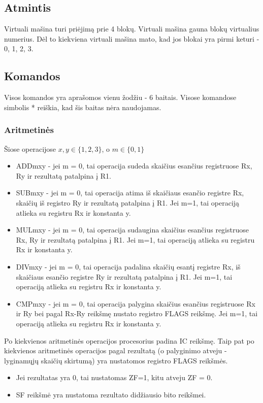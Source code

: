\documentclass{VUMIFInfKursinis}
\begin{document}
\subsection{Atmintis}

Virtuali mašina turi priėjimą prie 4 blokų. Virtuali mašina gauna blokų virtualius numerius. Dėl to kiekviena virtuali mašina mato, kad jos blokai yra pirmi keturi - 0, 1, 2, 3.

\subsection{Komandos}

Visos komandos yra aprašomos vienu žodžiu - 6 baitais. Visose komandose simbolis * reiškia, kad šis baitas nėra naudojamas.

\subsubsection{Aritmetinės}
Šiose operacijose $x, y \in \{1, 2, 3\}$, o $m \in \{0, 1\}$
\begin{itemize}
	\item ADDmxy - jei m = 0, tai operacija sudeda skaičius esančius registruose Rx, Ry ir rezultatą patalpina į R1.
	\item SUBmxy - jei m = 0, tai operacija atima iš skaičiaus esančio registre Rx, skaičių iš registro Ry ir rezultatą patalpina į R1. Jei m=1, tai operaciją atlieka su registru Rx ir konstanta y.
	\item MULmxy - jei m = 0, tai operacija sudaugina skaičius esančius registruose Rx, Ry ir rezultatą patalpina į R1. Jei m=1, tai operaciją atlieka su registru Rx ir konstanta y.
	\item DIVmxy - jei m = 0, tai operacija padalina skaičių esantį registre Rx, iš skaičiaus esančio registre Ry ir rezultatą patalpina į R1. Jei m=1, tai operaciją atlieka su registru Rx ir konstanta y.
	\item CMPmxy - jei m = 0, tai operacija palygina skaičius esančius registruose Rx ir Ry bei pagal Rx-Ry reikšmę nustato registro FLAGS reikšmę. Jei m=1, tai operaciją atlieka su registru Rx ir konstanta y.
\end{itemize}

Po kiekvienos aritmetinės operacijos procesorius padina IC reikšmę. Taip pat po kiekvienos aritmetinės operacijos pagal rezultatą (o palyginimo atveju - lyginamųjų skaičių skirtumą) yra nustatomos registro FLAGS reikšmės.

\begin{itemize}
	\item Jei rezultatas yra 0, tai nustatomas ZF=1, kitu atveju ZF = 0.
	\item SF reikšmė yra nustatoma rezultato didžiausio bito reikšmei.
\end{itemize}
\end{document}
